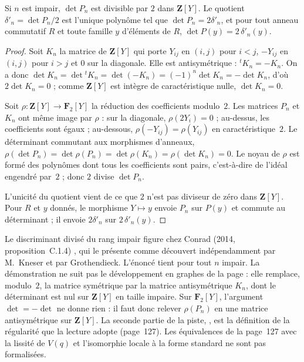 \begin{enonce}
Si $n$ est impair, $\det P_n$ est divisible par $2$ dans $\mathbf Z[Y]$. Le quotient $\delta'_n = \det P_n / 2$ est l'unique polynôme tel que $\det P_n = 2\delta'_n$, et pour tout anneau commutatif $R$ et toute famille $y$ d'éléments de $R$, $\det P(y) = 2\,\delta'_n(y)$.
\end{enonce}

\begin{proof}
Soit $K_n$ la matrice de $\mathbf Z[Y]$ qui porte $Y_{ij}$ en $(i, j)$ pour $i < j$, $-Y_{ij}$ en $(i, j)$ pour $i > j$ et $0$ sur la diagonale. Elle est antisymétrique : ${}^tK_n = -K_n$. On a donc $\det K_n = \det {}^tK_n = \det(-K_n) = (-1)^n \det K_n = -\det K_n$, d'où $2 \det K_n = 0$ ; comme $\mathbf Z[Y]$ est intègre de caractéristique nulle, $\det K_n = 0$.

Soit $\rho : \mathbf Z[Y] \to \mathbf F_2[Y]$ la réduction des coefficients modulo~$2$. Les matrices $P_n$ et $K_n$ ont même image par $\rho$ : sur la diagonale, $\rho(2Y_i) = 0$ ; au-dessus, les coefficients sont égaux ; au-dessous, $\rho(-Y_{ij}) = \rho(Y_{ij})$ en caractéristique~$2$. Le déterminant commutant aux morphismes d'anneaux, $\rho(\det P_n) = \det \rho(P_n) = \det \rho(K_n) = \rho(\det K_n) = 0$. Le noyau de $\rho$ est formé des polynômes dont tous les coefficients sont pairs, c'est-à-dire de l'idéal engendré par~$2$ ; donc $2$ divise $\det P_n$.

L'unicité du quotient vient de ce que $2$ n'est pas diviseur de zéro dans $\mathbf Z[Y]$. Pour $R$ et $y$ donnés, le morphisme $Y \mapsto y$ envoie $P_n$ sur $P(y)$ et commute au déterminant ; il envoie $2\delta'_n$ sur $2\,\delta'_n(y)$.
\end{proof}

\begin{remarque}
Le discriminant divisé du rang impair figure chez Conrad (2014, proposition~C.1.4) \cite{conrad2014}, qui le présente comme découvert indépendamment par M.~Kneser et par Grothendieck. L'énoncé tient pour tout $n$ impair. La démonstration ne suit pas le développement en graphes de la page : elle remplace, modulo~$2$, la matrice symétrique par la matrice antisymétrique $K_n$, dont le déterminant est nul sur $\mathbf Z[Y]$ en taille impaire. Sur $\mathbf F_2[Y]$, l'argument $\det = -\det$ ne donne rien : il faut donc relever $\rho(P_n)$ en une matrice antisymétrique sur $\mathbf Z[Y]$. La seconde partie de la piste, , est la définition de la régularité que la lecture adopte (page~127). Les équivalences de la page~127 avec la lissité de $V(q)$ et l'isomorphie locale à la forme standard ne sont pas formalisées.
\end{remarque}


